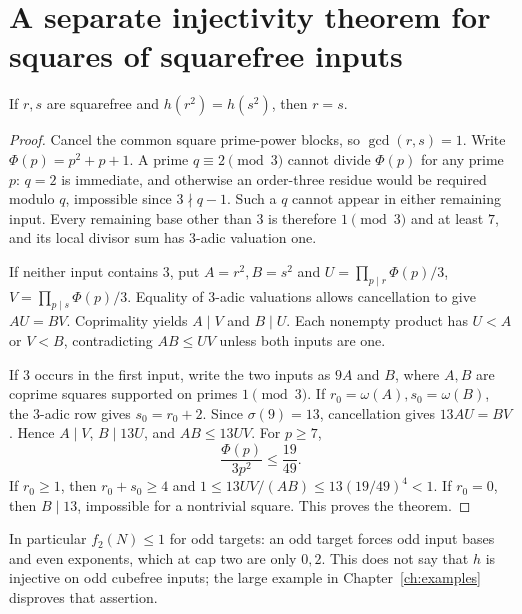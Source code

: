 \section{A separate injectivity theorem for squares of squarefree inputs}
\begin{theorem}
If $r,s$ are squarefree and $h(r^2)=h(s^2)$, then $r=s$.
\end{theorem}
\begin{proof}
Cancel the common square prime-power blocks, so $\gcd(r,s)=1$. Write
$\Phi(p)=p^2+p+1$. A prime $q\equiv2\pmod3$ cannot divide $\Phi(p)$ for any
prime $p$: $q=2$ is immediate, and otherwise an order-three residue would be
required modulo $q$, impossible since $3\nmid q-1$. Such a $q$ cannot appear
in either remaining input. Every remaining base other than $3$ is therefore
$1\pmod3$ and at least $7$, and its local divisor sum has $3$-adic valuation one.

If neither input contains $3$, put $A=r^2,B=s^2$ and
$U=\prod_{p\mid r}\Phi(p)/3$, $V=\prod_{p\mid s}\Phi(p)/3$.
Equality of $3$-adic valuations allows cancellation to give $AU=BV$.
Coprimality yields $A\mid V$ and $B\mid U$. Each nonempty product has
$U<A$ or $V<B$, contradicting $AB\le UV$ unless both inputs are one.

If $3$ occurs in the first input, write the two inputs as $9A$ and $B$, where
$A,B$ are coprime squares supported on primes $1\pmod3$. If
$r_0=\omega(A),s_0=\omega(B)$, the $3$-adic row gives $s_0=r_0+2$.
Since $\sigma(9)=13$, cancellation gives $13AU=BV$. Hence
$A\mid V$, $B\mid13U$, and $AB\le13UV$. For $p\ge7$,
\[
 \frac{\Phi(p)}{3p^2}\le\frac{19}{49}.
\]
If $r_0\ge1$, then $r_0+s_0\ge4$ and
$1\le13UV/(AB)\le13(19/49)^4<1$. If $r_0=0$, then $B\mid13$, impossible
for a nontrivial square. This proves the theorem.
\end{proof}
In particular $f_2(N)\le1$ for odd targets: an odd target forces odd input
bases and even exponents, which at cap two are only $0,2$. This does not say
that $h$ is injective on odd cubefree inputs; the large example in
Chapter~\ref{ch:examples} disproves that assertion.
